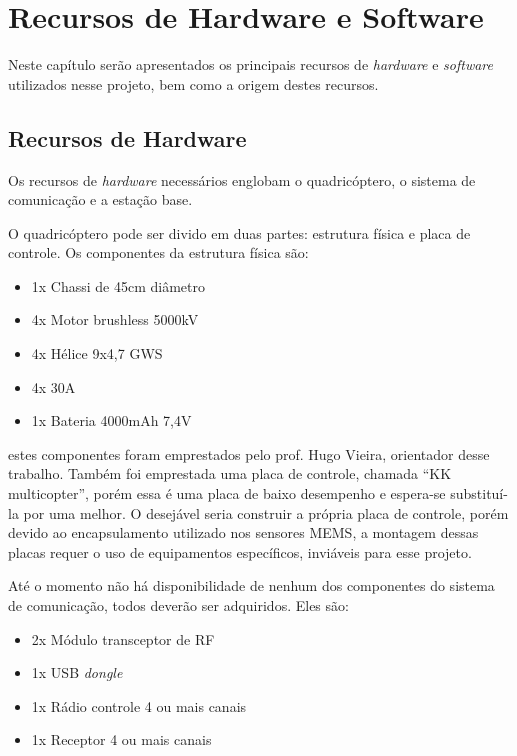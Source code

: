 \chapter{Recursos de Hardware e Software} \label{cap:recur}

Neste capítulo serão apresentados os principais recursos de \textit{hardware} e \textit{software} utilizados nesse projeto, bem como a origem destes recursos.


\section{Recursos de Hardware} \label{sec:recurhard}

Os recursos de \textit{hardware} necessários englobam o quadricóptero, o sistema de comunicação e a estação base.

O quadricóptero pode ser divido em duas partes: estrutura física e placa de controle. Os componentes da estrutura física são:

\begin{itemize}
\item 1x Chassi de 45cm diâmetro 
\item 4x Motor brushless 5000kV 
\item 4x Hélice 9x4,7 GWS 
\item 4x  30A 
\item 1x Bateria 4000mAh 7,4V
\end{itemize}

estes componentes foram emprestados pelo prof. Hugo Vieira, orientador desse trabalho. Também foi emprestada uma placa de controle, chamada ``KK multicopter'', porém essa é uma placa de baixo desempenho e espera-se substituí-la por uma melhor. O desejável seria construir a própria placa de controle, porém devido ao encapsulamento  utilizado nos sensores MEMS, a montagem dessas placas requer o uso de equipamentos específicos, inviáveis para esse projeto.

Até o momento não há disponibilidade de nenhum dos componentes do sistema de comunicação, todos deverão ser adquiridos. Eles são:

\begin{itemize}
\item 2x Módulo transceptor de RF
\item 1x USB \textit{dongle}
\item 1x Rádio controle 4 ou mais canais
\item 1x Receptor 4 ou mais canais
\end{itemize}

